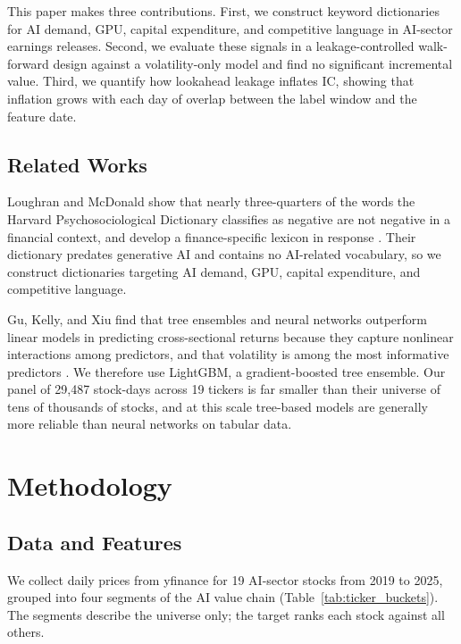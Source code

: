 \documentclass[10pt,letterpaper,twocolumn]{article}
\begin{document}
This paper makes three contributions. First, we construct keyword dictionaries for AI demand, GPU, capital expenditure, and competitive language in AI-sector earnings releases. Second, we evaluate these signals in a leakage-controlled walk-forward design against a volatility-only model and find no significant incremental value. Third, we quantify how lookahead leakage inflates IC, showing that inflation grows with each day of overlap between the label window and the feature date.

\subsection{Related Works}
Loughran and McDonald show that nearly three-quarters of the words the Harvard Psychosociological Dictionary classifies as negative are not negative in a financial context, and develop a finance-specific lexicon in response \cite{https://doi.org/10.1111/j.1540-6261.2010.01625.x}. Their dictionary predates generative AI and contains no AI-related vocabulary, so we construct dictionaries targeting AI demand, GPU, capital expenditure, and competitive language.

Gu, Kelly, and Xiu find that tree ensembles and neural networks outperform linear models in predicting cross-sectional returns because they capture nonlinear interactions among predictors, and that volatility is among the most informative predictors \cite{10.1093/rfs/hhaa009}. We therefore use LightGBM, a gradient-boosted tree ensemble. Our panel of 29,487 stock-days across 19 tickers is far smaller than their universe of tens of thousands of stocks, and at this scale tree-based models are generally more reliable than neural networks on tabular data.

\section{Methodology}

\subsection{Data and Features}
We collect daily prices from yfinance for 19 AI-sector stocks from 2019 to 2025, grouped into four segments of the AI value chain (Table~\ref{tab:ticker_buckets}). The segments describe the universe only; the target ranks each stock against all others.
\end{document}
